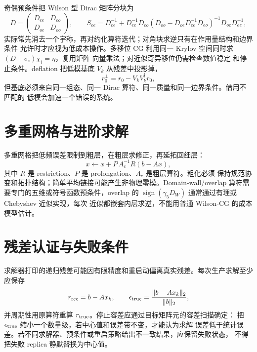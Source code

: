 奇偶预条件把 Wilson 型 Dirac 矩阵分块为
\begin{equation}
  D=\begin{pmatrix}D_{ee}&D_{eo}\\D_{oe}&D_{oo}\end{pmatrix},
  \qquad
  S_{ee}=D_{ee}^{-1}+D_{ee}^{-1}D_{eo}
  \left(D_{oo}-D_{oe}D_{ee}^{-1}D_{eo}\right)^{-1}
  D_{oe}D_{ee}^{-1},
  \label{eq:b03-even-odd}
\end{equation}
实际常先消去一个宇称，再对约化算符迭代；对角块求逆只有在作用量结构和边界条件
允许时才应视为低成本操作。多移位 CG 利用同一 Krylov 空间同时求
\((D+\sigma_i)\chi_i=\eta\)，复用矩阵-向量乘法；对近似奇异移位仍需检查数值稳定
和停止条件。deflation 把低模基底 \(V_k\) 从残差中投影掉，
\begin{equation}
  r_0^{\perp}=r_0-V_kV_k^\dagger r_0,
  \label{eq:b03-deflation}
\end{equation}
但基底必须来自同一组态、同一 Dirac 算符、同一质量和同一边界条件。借用不匹配的
低模会加速一个错误的系统。

\section{多重网格与进阶求解}

多重网格把低频误差限制到粗层，在粗层求修正，再延拓回细层：
\begin{equation}
  x\leftarrow x+P\,A_c^{-1}R(b-Ax),
  \label{eq:b03-multigrid}
\end{equation}
其中 \(R\) 是 restriction、\(P\) 是 prolongation、\(A_c\) 是粗层算符。粗化必须
保持规范协变和拓扑结构；简单平均链接可能产生非物理零模。Domain-wall/overlap
算符需要专门的五维或符号函数预条件，overlap 的
\(\operatorname{sign}(\gamma_5D_W)\) 通常通过有理或 Chebyshev 近似实现，每次
近似都嵌套内层求逆，不能用普通 Wilson-CG 的成本模型估计。

\section{残差认证与失败条件}

求解器打印的递归残差可能因有限精度和重启动偏离真实残差。每次生产求解至少应保存
\begin{equation}
  r_{\rm rec}=b-Ax_k,
  \qquad
  \epsilon_{\rm true}=\frac{\|b-Ax_k\|_2}{\|b\|_2},
  \label{eq:b03-true-residual}
\end{equation}
并周期性用原算符重算 \(r_{\rm true}\)。停止容差应通过目标矩阵元的容差扫描确定：
把 \(\epsilon_{\rm true}\) 缩小一个数量级，若中心值和误差带不变，才能认为求解
误差低于统计误差。若不同求解器、预条件或重启策略给出不一致结果，应保留失败状态，
不得把失败 replica 静默替换为中心值。

